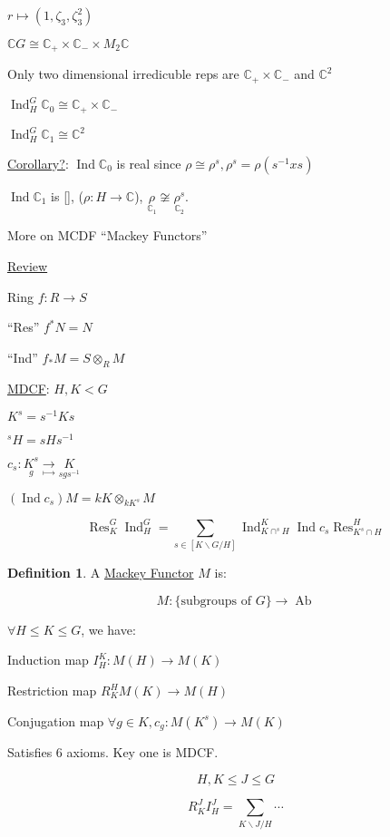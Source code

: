 \documentclass{article}
\theoremstyle{definition}
\newtheorem*{definition}{Definition}
\begin{document}
\(r \mapsto (1, \zeta_3, \zeta_3^2)\) 

\(\mathbb{C} G \cong \mathbb{C}_+ \times \mathbb{C}_- \times M_2\mathbb{C}\) 

Only two dimensional irredicuble reps are \(\mathbb{C} _+ \times \mathbb{C}_-\) and \(\mathbb{C}^2\) 

\(\operatorname{Ind}_H^G \mathbb{C}_0 \cong \mathbb{C}_+ \times \mathbb{C}_-\) 

\(\operatorname{Ind}_H^G \mathbb{C}_1 \cong \mathbb{C}^2\) 

\underline{Corollary?}: \(\operatorname{Ind} \mathbb{C}_0\) is real since \(\rho  \cong \rho^s, \rho^s = \rho (s ^{-1} x s)\) 

\(\operatorname{Ind} \mathbb{C}_1\) is [], (\(\rho: H \to \mathbb{C}\)), \(\underset{\mathbb{C}_1}{\rho} \not\cong \underset{\mathbb{C}_2}{\rho^s} \).

More on MCDF ``Mackey Functors''

\underline{Review}

Ring \(f: R \to S\)

\begin{center}
\end{center}

``Res'' \(f^{\ast} N = N\) 

``Ind'' \(f_{\ast} M = S \otimes_R M\) 

\underline{MDCF}: \(H, K < G\) 

\(K^s = s ^{-1} K s\) 

\(^s H = s H s ^{-1}\) 

\(c_s : \underset{g}{K^s} \underset{\mapsto}{\to} \underset{s g s ^{-1}}{K}\)

\((\operatorname{Ind} c_s) M = kK \otimes_{kK^s} M\) 

\[
    \boxed{\operatorname{R es}_K^G \operatorname{Ind}_H^G = \sum_{s\in [K \backslash G / H]} \operatorname{Ind}^K_{K \cap ^s H} \operatorname{Ind} c_s \operatorname{R es}^H_{K^s\cap H}} 
\]

\begin{definition}
    A \underline{Mackey Functor} \(M\) is:

    \[
        M : \{ \text{subgroups of } G \} \to \operatorname{Ab}
    \]

    \(\forall H \leq K \leq G\), we have: 
    
    Induction map \(I_H^K : M(H) \to M(K)\)
    
    Restriction map \(R^H_K M(K) \to M(H)\) 

    Conjugation map \(\forall g\in K, c_g : M(K^s) \to M(K)\)

    Satisfies \(6\) axioms. Key one is MDCF.

    \[
        H, K \leq J \leq G
    \]

    \[
        R_K^J I_H^J =\sum_{K \backslash J / H} \cdots 
    \]
\end{definition}
\end{document}
